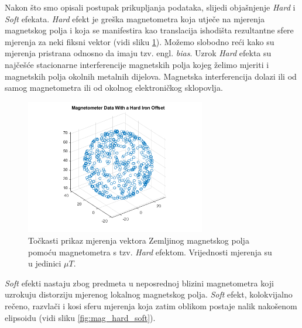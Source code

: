 \documentclass[times, utf8, diplomski, numeric]{templates/template}
\begin{document}
{{{{                Nakon što smo opisali postupak prikupljanja podataka, slijedi objašnjenje \emph{Hard} i \emph{Soft} efekata. \emph{Hard} efekt je greška magnetometra koja utječe na mjerenja magnetskog polja i koja se  manifestira kao translacija ishodišta rezultantne sfere mjerenja za neki fiksni vektor (vidi sliku \ref{fig:mag_hard}). Možemo slobodno reći kako su mjerenja pristrana odnosno da imaju tzv. engl. \emph{bias}. Uzrok \emph{Hard} efekta su najčešće stacionarne interferencije magnetskih polja kojeg želimo mjeriti i magnetskih polja okolnih metalnih dijelova. Magnetska interferencija dolazi ili od samog magnetometra ili od okolnog elektroničkog sklopovlja. 

                \begin{figure}[htb]
                \centering
                \includegraphics[width=0.7\textwidth]{images/mag_hard.png}
                \caption{Točkasti prikaz mjerenja vektora Zemljinog magnetskog polja pomoću magnetometra s tzv. \emph{Hard} efektom. Vrijednosti mjerenja su u jedinici $\mu T$.}
                \label{fig:mag_hard}
                \end{figure}

                \emph{Soft} efekti nastaju zbog predmeta u neposrednoj blizini magnetometra koji uzrokuju distorziju mjerenog lokalnog magnetskog polja. \emph{Soft} efekt, kolokvijalno rečeno, razvlači i kosi sferu mjerenja koja zatim oblikom postaje nalik nakošenom elipsoidu (vidi sliku \ref{fig:mag_hard_soft}).

}}}}
\end{document}
